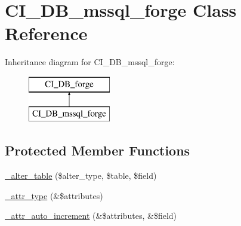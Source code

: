 \hypertarget{class_c_i___d_b__mssql__forge}{}\section{C\+I\+\_\+\+D\+B\+\_\+mssql\+\_\+forge Class Reference}
\label{class_c_i___d_b__mssql__forge}
Inheritance diagram for C\+I\+\_\+\+D\+B\+\_\+mssql\+\_\+forge\+:\begin{figure}[H]
\begin{center}
\leavevmode
\includegraphics[height=2.000000cm]{class_c_i___d_b__mssql__forge}
\end{center}
\end{figure}
\subsection*{Protected Member Functions}
\begin{DoxyCompactItemize}
\item 
\mbox{\hyperlink{class_c_i___d_b__mssql__forge_afbd25285c72f0eb96c01fe66e441105a}{\+\_\+alter\+\_\+table}} (\$alter\+\_\+type, \$table, \$field)
\item 
\mbox{\hyperlink{class_c_i___d_b__mssql__forge_a785d56f731013240dea9d13bae6dbfe4}{\+\_\+attr\+\_\+type}} (\&\$attributes)
\item 
\mbox{\hyperlink{class_c_i___d_b__mssql__forge_aad30c76eef3f26af91c71277c162c41f}{\+\_\+attr\+\_\+auto\+\_\+increment}} (\&\$attributes, \&\$field)
\end{DoxyCompactItemize}
